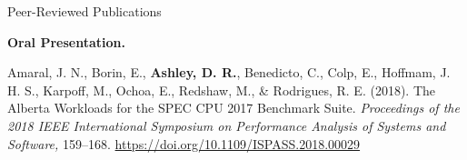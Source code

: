 \documentclass[a4paper,dateabbrev]{cv}
\begin{document}
\begin{rSection}{Peer-Reviewed Publications}
\begin{rPublications}
        \nopagebreak\vspace{-0.4em}\nopagebreak
        \textbf{Oral Presentation.}
    \item \label{pub:amaral2018alberta}
        Amaral, J. N., Borin, E., \textbf{Ashley, D. R.}, Benedicto, C., Colp, E., Hoffmam, J. H. S., Karpoff, M., Ochoa, E., Redshaw, M., \& Rodrigues, R. E.
        (2018).
        The Alberta Workloads for the SPEC CPU 2017 Benchmark Suite.
        \textit{Proceedings of the 2018 IEEE International Symposium on Performance Analysis of Systems and Software,} 159--168.
        \url{https://doi.org/10.1109/ISPASS.2018.00029}
\end{rPublications}

\end{rSection}

\end{document}
